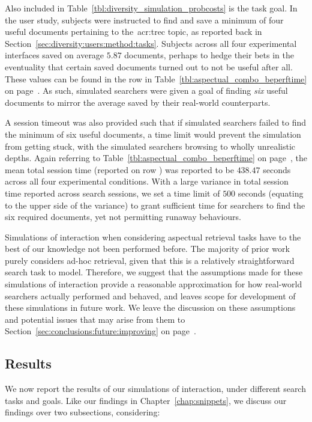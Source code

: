 Also included in Table~\ref{tbl:diversity_simulation_probcosts} is the task goal. In the user study, subjects were instructed to find and save a minimum of four useful documents pertaining to the~\gls{acr:trec} topic, as reported back in Section~\ref{sec:diversity:users:method:tasks}. Subjects across all four experimental interfaces saved on average $5.87$ documents, perhaps to hedge their bets in the eventuality that certain saved documents turned out to not be useful after all. These values can be found in the  row in Table~\ref{tbl:aspectual_combo_beperftime} on page~\pageref{tbl:aspectual_combo_beperftime}. As such, simulated searchers were given a goal of finding \emph{six} useful documents to mirror the average saved by their real-world counterparts.

A session timeout was also provided such that if simulated searchers failed to find the minimum of six useful documents, a time limit would prevent the simulation from getting stuck, with the simulated searchers browsing to wholly unrealistic depths. Again referring to Table~\ref{tbl:aspectual_combo_beperftime} on page~\pageref{tbl:aspectual_combo_beperftime}, the mean total session time (reported on row ) was reported to be $438.47$ seconds across all four experimental conditions. With a large variance in total session time reported across search sessions, we set a time limit of $500$ seconds (equating to the upper side of the variance) to grant sufficient time for searchers to find the six required documents, yet not permitting runaway behaviours.

Simulations of interaction when considering aspectual retrieval tasks have to the best of our knowledge not been performed before. The majority of prior work purely considers ad-hoc retrieval, given that this is a relatively straightforward search task to model. Therefore, we suggest that the assumptions made for these simulations of interaction provide a reasonable approximation for how real-world searchers actually performed and behaved, and leaves scope for development of these simulations in future work. We leave the discussion on these assumptions and potential issues that may arise from them to Section~\ref{sec:conclusions:future:improving} on page~\pageref{sec:conclusions:future:improving}.

\subsection{Results}\label{sec:diversity:simulated:results}
We now report the results of our simulations of interaction, under different search tasks and goals. Like our findings in Chapter~\ref{chap:snippets}, we discuss our findings over two subsections, considering:


